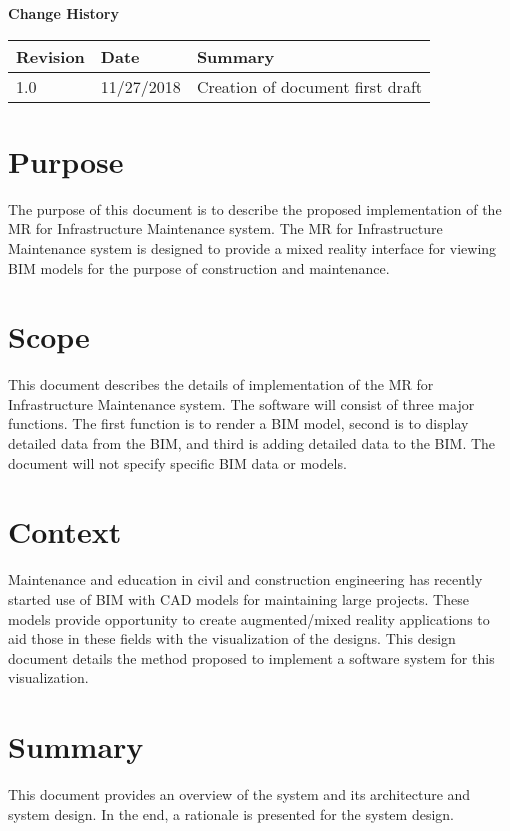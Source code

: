 \documentclass[onecolumn, draftclsnofoot,10pt, compsoc]{IEEEtran}
\begin{document}
\textbf{Change History}\par

\begin{tabular}{ p{2cm} p{4cm} p{} }
 \textbf{Revision} & \textbf{Date} & \textbf{Summary} \\
 \hline
 1.0 & 11/27/2018 & Creation of document first draft
\end{tabular}

\tableofcontents
\listoffigures
\clearpage

\section{Purpose}
The purpose of this document is to describe the proposed implementation of the MR for Infrastructure Maintenance system.
The MR for Infrastructure Maintenance system is designed to provide a mixed reality interface for viewing BIM models for the purpose of construction and maintenance.
\par

\section{Scope}
This document describes the details of implementation of the MR for Infrastructure Maintenance system.
The software will consist of three major functions.
The first function is to render a BIM model, second is to display detailed data from the BIM, and third is adding detailed data to the BIM.
The document will not specify specific BIM data or models.\par

\section{Context}
Maintenance and education in civil and construction engineering has recently started use of BIM with CAD models for maintaining large projects.
These models provide opportunity to create augmented/mixed reality applications to aid those in these fields with the visualization of the designs.
This design document details the method proposed to implement a software system for this visualization.
\par

\section{Summary}
This document provides an overview of the system and its architecture and system design.
In the end, a rationale is presented for the system design.
\end{document}
